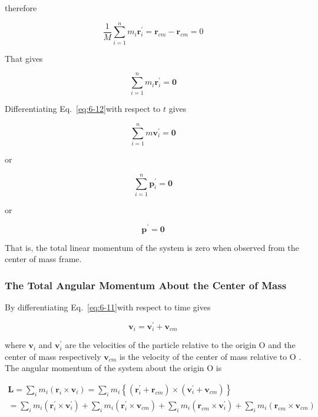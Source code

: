 \documentclass[10pt]{article}
\numberwithin{equation}{section}
\begin{document}
therefore

$$
\frac{1}{M} \sum_{i=1}^{n} m_{i} \mathbf{r}_{i}^{\prime}=\mathbf{r}_{c m}-\mathbf{r}_{c m}=0
$$

That gives


\begin{equation}
\sum_{i=1}^{n} m_{i} \mathbf{r}_{i}^{\prime}=\mathbf{0} \label{eq:6-12}
\end{equation}


Differentiating Eq.~\eqref{eq:6-12}with respect to $t$ gives


\begin{equation}
\sum_{i=1}^{n} m \mathbf{v}_{i}^{\prime}=\mathbf{0} \label{eq:6-13}
\end{equation}


or

$$
\sum_{i=1}^{n} \mathbf{p}_{i}^{\prime}=\mathbf{0}
$$

or

$$
\mathbf{p}^{\prime}=\mathbf{0}
$$

That is, the total linear momentum of the system is zero when observed from the center of mass frame.

\subsubsection{The Total Angular Momentum About the Center of Mass}\label{sec:6-4-2}
By differentiating Eq.~\eqref{eq:6-11}with respect to time gives


\begin{equation}
\mathbf{v}_{i}=\mathbf{v}_{i}^{\prime}+\mathbf{v}_{c m} \label{eq:6-14}
\end{equation}


where $\mathbf{v}_{i}$ and $\mathbf{v}_{i}^{\prime}$ are the velocities of the particle relative to the origin O and the center of mass respectively $\mathbf{v}_{c m}$ is the velocity of the center of mass relative to O . The angular momentum of the system about the origin O is

$$
\begin{gathered}
\mathbf{L}=\sum_{i} m_{i}\left(\mathbf{r}_{i} \times \mathbf{v}_{i}\right)=\sum_{i} m_{i}\left\{\left(\mathbf{r}_{i}^{\prime}+\mathbf{r}_{c m}\right) \times\left(\mathbf{v}_{i}^{\prime}+\mathbf{v}_{c m}\right)\right\} \\
=\sum_{i} m_{i}\left(\mathbf{r}_{i}^{\prime} \times \mathbf{v}_{i}^{\prime}\right)+\sum_{i} m_{i}\left(\mathbf{r}_{i}^{\prime} \times \mathbf{v}_{c m}\right)+\sum_{i} m_{i}\left(\mathbf{r}_{c m} \times \mathbf{v}_{i}^{\prime}\right)+\sum_{i} m_{i}\left(\mathbf{r}_{c m} \times \mathbf{v}_{c m}\right)
\end{gathered}
$$
\end{document}
